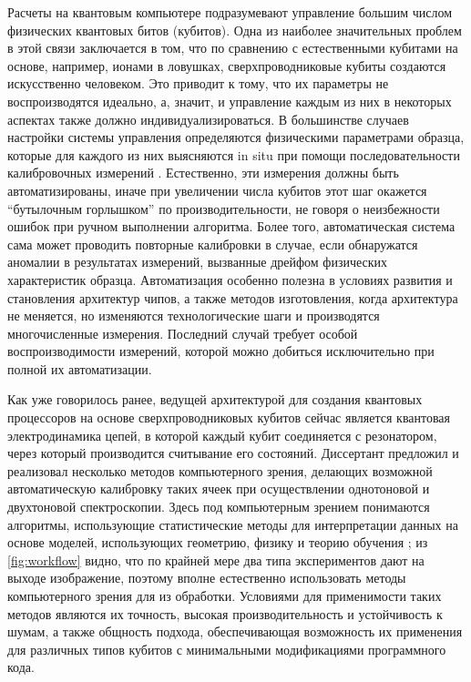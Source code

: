 \documentclass[14pt, a4paper]{extreport}
\numberwithin{equation}{section}
\begin{document}
Расчеты на квантовым компьютере подразумевают управление большим числом физических квантовых битов (кубитов). Одна из наиболее значительных проблем в этой связи заключается в том, что по сравнению с естественными кубитами на основе, например, ионами в ловушках, сверхпроводниковые кубиты создаются искусственно человеком. Это приводит к тому, что их параметры не воспроизводятся идеально, а, значит, и управление каждым из них в некоторых аспектах также должно индивидуализироваться. В большинстве случаев настройки системы управления определяются физическими параметрами образца, которые для каждого из них выясняются in situ при помощи последовательности калибровочных измерений \cite{kelly2018physical, chen2018metrology, fedorov2019automated}. Естественно, эти измерения должны быть автоматизированы, иначе при увеличении числа кубитов этот шаг окажется ``бутылочным горлышком'' по производительности, не говоря о неизбежности ошибок при ручном выполнении алгоритма. Более того, автоматическая система сама может проводить повторные калибровки в случае, если обнаружатся аномалии в результатах измерений, вызванные дрейфом физических характеристик образца. Автоматизация особенно полезна в условиях развития и становления архитектур чипов, а также методов изготовления, когда архитектура не меняется, но изменяются технологические шаги и производятся многочисленные измерения. Последний случай требует особой воспроизводимости измерений, которой можно добиться исключительно при полной их автоматизации.

Как уже говорилось ранее, ведущей архитектурой для создания квантовых процессоров на основе сверхпроводниковых кубитов сейчас является квантовая электродинамика цепей, в которой каждый кубит соединяется с резонатором, через который производится считывание его состояний. Диссертант предложил и реализовал несколько методов компьютерного зрения, делающих возможной автоматическую калибровку таких ячеек при осуществлении однотоновой и двухтоновой спектроскопии. Здесь под компьютерным зрением понимаются алгоритмы, использующие статистические методы для интерпретации данных на основе моделей, использующих геометрию, физику и теорию обучения \cite{forsyth2012computer}; из \autoref{fig:workflow} видно, что по крайней мере два типа экспериментов дают на выходе изображение, поэтому вполне естественно использовать методы компьютерного зрения для из обработки. Условиями для применимости таких методов являются их точность, высокая производительность и устойчивость к шумам, а также общность подхода, обеспечивающая возможность их применения для различных типов кубитов с минимальными модификациями программного кода.
\end{document}
